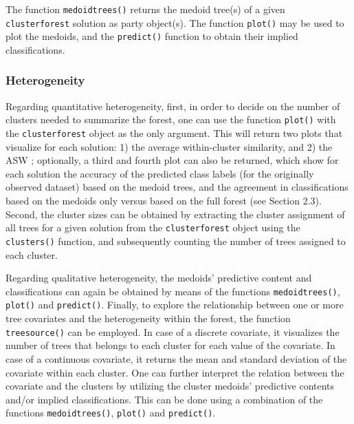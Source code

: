 The function \texttt{medoidtrees()} returns the medoid tree(s) of a given \texttt{clusterforest} solution as party object(s). The function \texttt{plot()} may be used to plot the medoids, and the \texttt{predict()} function to obtain their implied classifications.


\subsubsection{Heterogeneity}
Regarding quantitative heterogeneity, first, in order to decide on the number of clusters needed to summarize the forest, one can use the function \texttt{plot()} with the \texttt{clusterforest} object as the only argument. This will return two plots that visualize for each solution: 1) the average within-cluster similarity, and 2) the ASW \citep{Rousseeuw1987}; optionally, a third and fourth plot can also be returned, which show for each solution the accuracy of the predicted class labels (for the originally observed dataset) based on the medoid trees, and the agreement in classifications based on the medoids only versus based on the full forest (see Section 2.3). Second, the cluster sizes can be obtained by extracting the cluster assignment of all trees for a given solution from the \texttt{clusterforest} object using the \texttt{clusters()} function, and subsequently counting the number of trees assigned to each cluster.

Regarding qualitative heterogeneity, the medoids' predictive content and classifications can again be obtained by means of the functions \texttt{medoidtrees()}, \texttt{plot()} and \texttt{predict()}. 
Finally, to explore the relationship between one or more tree covariates and the heterogeneity within the forest, the function \texttt{treesource()} can be employed. In case of a discrete covariate, it visualizes the number of trees that belongs to each cluster for each value of the covariate. In case of a continuous covariate, it returns the mean and standard deviation of the covariate within each cluster. One can further interpret the relation between the covariate and the clusters by utilizing the cluster medoids' predictive contents and/or implied classifications. This can be done using a combination of the functions \texttt{medoidtrees()}, \texttt{plot()} and \texttt{predict()}.


